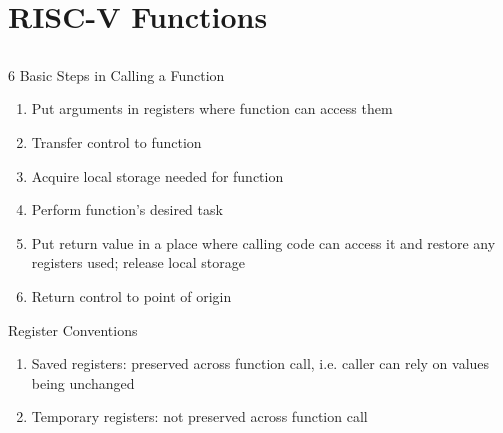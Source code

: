 \chapter{RISC-V Functions}
\section{}

6 Basic Steps in Calling a Function
\begin{enumerate}
    \item Put arguments in registers where function can access them
    \item Transfer control to function
    \item Acquire local storage needed for function
    \item Perform function's desired task
    \item Put return value in a place where calling code can access it and restore any registers used; release local storage
    \item Return control to point of origin
\end{enumerate}

Register Conventions
\begin{enumerate}
    \item Saved registers: preserved across function call, i.e. caller can rely on values being unchanged
    \item Temporary registers: not preserved across function call  
\end{enumerate}
